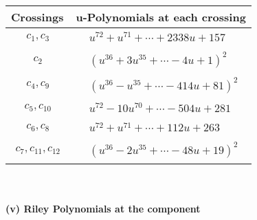 \documentclass[1p]{elsarticle_modified}
\theoremstyle{definition}
\begin{document}
\begin{tabular}{m{50pt}|m{274pt}}
Crossings & \hspace{64pt}u-Polynomials at each crossing \\
\hline $$\begin{aligned}c_{1},c_{3}\end{aligned}$$&$\begin{aligned}
&u^{72}+u^{71}+\cdots+2338 u+157
\end{aligned}$\\
\hline $$\begin{aligned}c_{2}\end{aligned}$$&$\begin{aligned}
&(u^{36}+3 u^{35}+\cdots-4 u+1)^{2}
\end{aligned}$\\
\hline $$\begin{aligned}c_{4},c_{9}\end{aligned}$$&$\begin{aligned}
&(u^{36}- u^{35}+\cdots-414 u+81)^{2}
\end{aligned}$\\
\hline $$\begin{aligned}c_{5},c_{10}\end{aligned}$$&$\begin{aligned}
&u^{72}-10 u^{70}+\cdots-504 u+281
\end{aligned}$\\
\hline $$\begin{aligned}c_{6},c_{8}\end{aligned}$$&$\begin{aligned}
&u^{72}+u^{71}+\cdots+112 u+263
\end{aligned}$\\
\hline $$\begin{aligned}c_{7},c_{11},c_{12}\end{aligned}$$&$\begin{aligned}
&(u^{36}-2 u^{35}+\cdots-48 u+19)^{2}
\end{aligned}$\\
\hline
\end{tabular}\\~\\
\newpage\renewcommand{\arraystretch}{1}
\flushleft \textbf{(v) Riley Polynomials at the component}\newline \\
\end{document}
